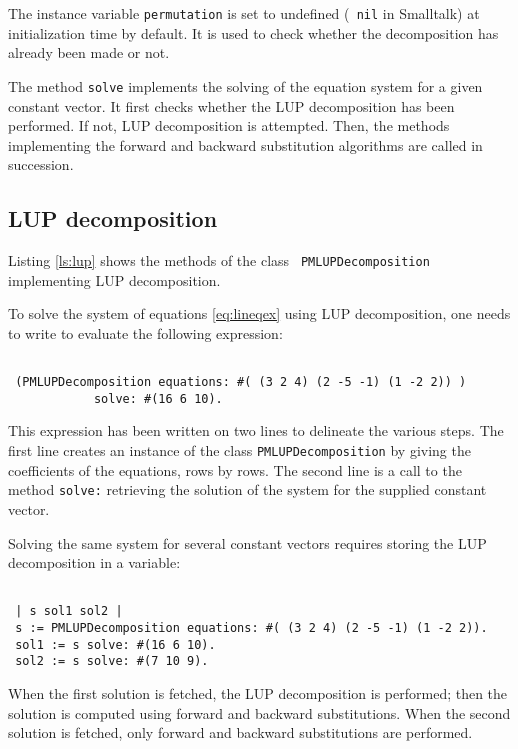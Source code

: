\documentclass[twoside]{book}
\begin{document}
The instance variable {\tt permutation} is set to undefined ({\tt
nil} in Smalltalk) at initialization time by
default. It is used to check whether the decomposition has already
been made or not.

The method {\tt solve} implements the solving of the equation
system for a given constant vector. It first checks whether the
LUP decomposition has been performed. If not, LUP decomposition is
attempted. Then, the methods implementing the forward and backward
substitution algorithms are called in succession.

\subsection{LUP decomposition}
Listing \ref{ls:lup} shows the methods of the class {\tt
PMLUPDecomposition} implementing LUP decomposition.

To solve the system of equations \ref{eq:lineqex} using LUP
decomposition, one needs to write to evaluate the following
expression:
\begin{codeExample}
\begin{verbatim}

 (PMLUPDecomposition equations: #( (3 2 4) (2 -5 -1) (1 -2 2)) )
            solve: #(16 6 10).
\end{verbatim}
\end{codeExample}
This expression has been written on two lines to delineate the
various steps. The first line creates an instance of the class
{\tt PMLUPDecomposition} by giving the coefficients of the
equations, rows by rows. The second line is a call to the method
{\tt solve:} retrieving the solution of the system for the
supplied constant vector.

Solving the same system for several constant vectors requires
storing the LUP decomposition in a variable:
\begin{codeExample}
\begin{verbatim}

 | s sol1 sol2 |
 s := PMLUPDecomposition equations: #( (3 2 4) (2 -5 -1) (1 -2 2)).
 sol1 := s solve: #(16 6 10).
 sol2 := s solve: #(7 10 9).
\end{verbatim}
\end{codeExample}
When the first solution is fetched, the LUP decomposition is
performed; then the solution is computed using forward and
backward substitutions. When the second solution is fetched, only
forward and backward substitutions are performed.
\end{document}
